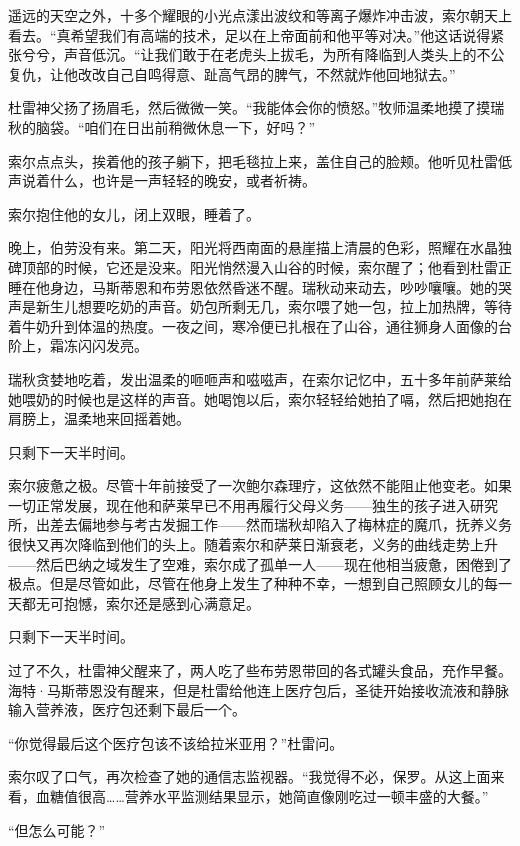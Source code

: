 \documentclass[AutoFakeBold=true]{book}
\begin{document}
遥远的天空之外，十多个耀眼的小光点漾出波纹和等离子爆炸冲击波，索尔朝天上看去。``真希望我们有高端的技术，足以在上帝面前和他平等对决。''他这话说得紧张兮兮，声音低沉。``让我们敢于在老虎头上拔毛，为所有降临到人类头上的不公复仇，让他改改自己自鸣得意、趾高气昂的脾气，不然就炸他回地狱去。''

杜雷神父扬了扬眉毛，然后微微一笑。``我能体会你的愤怒。''牧师温柔地摸了摸瑞秋的脑袋。``咱们在日出前稍微休息一下，好吗？''

索尔点点头，挨着他的孩子躺下，把毛毯拉上来，盖住自己的脸颊。他听见杜雷低声说着什么，也许是一声轻轻的晚安，或者祈祷。

索尔抱住他的女儿，闭上双眼，睡着了。

\vspace*{1em}

晚上，伯劳没有来。第二天，阳光将西南面的悬崖描上清晨的色彩，照耀在水晶独碑顶部的时候，它还是没来。阳光悄然漫入山谷的时候，索尔醒了；他看到杜雷正睡在他身边，马斯蒂恩和布劳恩依然昏迷不醒。瑞秋动来动去，吵吵嚷嚷。她的哭声是新生儿想要吃奶的声音。奶包所剩无几，索尔喂了她一包，拉上加热牌，等待着牛奶升到体温的热度。一夜之间，寒冷便已扎根在了山谷，通往狮身人面像的台阶上，霜冻闪闪发亮。

瑞秋贪婪地吃着，发出温柔的咂咂声和嗞嗞声，在索尔记忆中，五十多年前萨莱给她喂奶的时候也是这样的声音。她喝饱以后，索尔轻轻给她拍了嗝，然后把她抱在肩膀上，温柔地来回摇着她。

只剩下一天半时间。

索尔疲惫之极。尽管十年前接受了一次鲍尔森理疗，这依然不能阻止他变老。如果一切正常发展，现在他和萨莱早已不用再履行父母义务——独生的孩子进入研究所，出差去偏地参与考古发掘工作——然而瑞秋却陷入了梅林症的魔爪，抚养义务很快又再次降临到他们的头上。随着索尔和萨莱日渐衰老，义务的曲线走势上升——然后巴纳之域发生了空难，索尔成了孤单一人——现在他相当疲惫，困倦到了极点。但是尽管如此，尽管在他身上发生了种种不幸，一想到自己照顾女儿的每一天都无可抱憾，索尔还是感到心满意足。

只剩下一天半时间。

过了不久，杜雷神父醒来了，两人吃了些布劳恩带回的各式罐头食品，充作早餐。海特·马斯蒂恩没有醒来，但是杜雷给他连上医疗包后，圣徒开始接收流液和静脉输入营养液，医疗包还剩下最后一个。

``你觉得最后这个医疗包该不该给拉米亚用？''杜雷问。

索尔叹了口气，再次检查了她的通信志监视器。``我觉得不必，保罗。从这上面来看，血糖值很高……营养水平监测结果显示，她简直像刚吃过一顿丰盛的大餐。''

``但怎么可能？''
\end{document}
